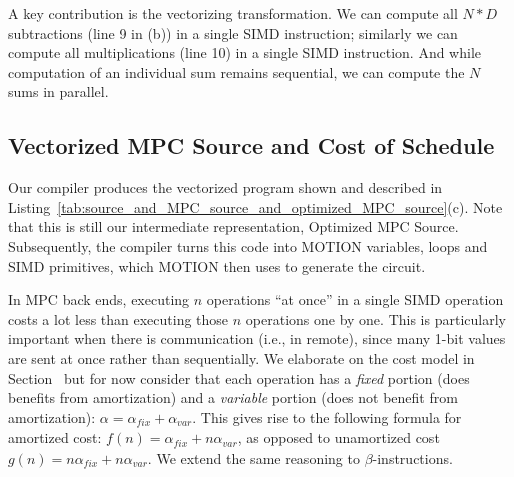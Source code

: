 A key contribution is the vectorizing transformation. We can compute all $N*D$
subtractions (line 9 in (b)) in a single SIMD instruction; similarly we can compute
all multiplications (line 10) in a single SIMD instruction. And while computation
of an individual sum remains sequential, we can compute the $N$ sums in parallel.

\subsection{Vectorized MPC Source and Cost of Schedule}

Our compiler produces the vectorized program shown and described in 
Listing~\ref{tab:source_and_MPC_source_and_optimized_MPC_source}(c).
Note that this is still our intermediate representation, Optimized MPC Source. Subsequently,
the compiler turns this code into MOTION variables, loops and SIMD primitives, which MOTION then
uses to generate the circuit.
\begin{comment}
The compiler determines that SUB and MUL in ``naive'' MPC Source (lines 9 and 10 in (b))
can be fully vectorized into the SIMD SUB and MUL in optimized MPC Source (lines 9 and 10 in (c)).
Notation {\sf p[I,J]} denotes a 2-dimensional array with fully vectorized dimensions.
The computation of sum (line 11 in (b))
is sequential across the $j$-dimension, but it is parallel across the $i$-dimension.
The loop in lines 12-16 in (c) illustrates; here {\sf p[I,j]} refers to the $j$-th column in {\sf p}.
Unfortunately, CMP and MUX remain sequential.
\end{comment}

In MPC back ends, executing $n$ operations ``at once'' in a single SIMD operation costs a lot less than executing those $n$ operations one by one.
This is particularly important when there is communication (i.e., in remote), since many 1-bit values are sent at once rather than sequentially.
We elaborate on the cost model in Section~ but for now consider that
each operation has a \emph{fixed} portion (does benefits from amortization) and
a \emph{variable} portion (does not benefit from amortization): $\alpha = \alpha_\mathit{fix} + \alpha_\mathit{var}$.
This gives rise to the following formula for amortized cost: $f(n) = \alpha_\mathit{fix} + n\alpha_\mathit{var}$,
as opposed to unamortized cost $g(n) = n\alpha_\mathit{fix} + n\alpha_\mathit{var}$. We extend the same reasoning to
$\beta$-instructions.

